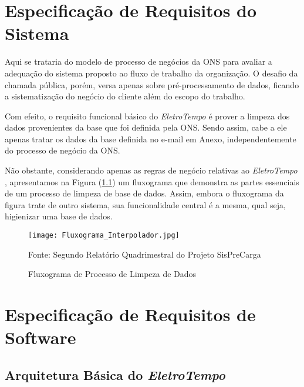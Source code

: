 \documentclass[a4paper, 12pt]{report}
\begin{document}
\chapter{Especificação de Requisitos do Sistema}

\begin{doublespace}
Aqui se trataria do modelo de processo de negócios da ONS para avaliar a adequação do sistema proposto ao fluxo de trabalho da organização.  O desafio da chamada pública, porém, versa apenas sobre pré-processamento de dados, ficando a sistematização do negócio do cliente além do escopo do trabalho.

Com efeito, o requisito funcional básico do \textit{EletroTempo} \textsuperscript{\textregistered} é prover a limpeza dos dados provenientes da base que foi definida pela ONS.  Sendo assim, cabe a ele apenas tratar os dados da base definida no e-mail em Anexo, independentemente do processo de negócio da ONS.

Não obstante, considerando apenas as regras de negócio relativas ao \textit{EletroTempo} \textsuperscript{\textregistered}, apresentamos na Figura (\ref{FluxogramaLight}) um fluxograma que demonstra as partes essenciais de um processo de limpeza de base de dados.  Assim, embora o fluxograma da figura trate de outro sistema, sua funcionalidade central é a mesma, qual seja, higienizar uma base de dados.


\begin{figure}[H]
	\caption{\label{FluxogramaLight} Fluxograma de Processo de Limpeza de Dados}
	\begin{center}
		\texttt{[image: Fluxograma\_Interpolador.jpg]}
		
		Fonte: Segundo Relatório Quadrimestral do Projeto SisPreCarga
	\end{center}
	
\end{figure}

\end{doublespace}




\chapter{Especificação de Requisitos de Software }


\section{Arquitetura Básica do \textit{EletroTempo} }
\end{document}

